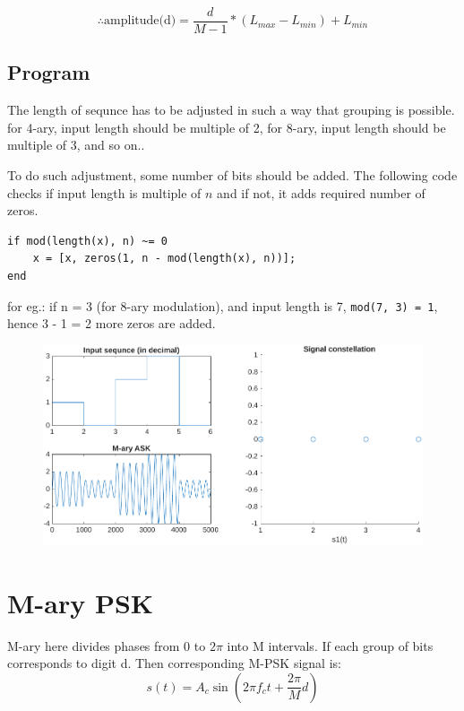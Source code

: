 $$\therefore \text{amplitude(d)} = \frac{d}{M-1} * (L_{max} - L_{min}) + L_{min}$$

\subsection*{Program}
The length of sequnce has to be adjusted in such a way that grouping is possible. for 4-ary, input length should be multiple of 2, for 8-ary, input length should be multiple of 3, and so on..

To do such adjustment, some number of bits should be added. The following code checks if input length is multiple of $n$ and if not, it adds required number of zeros.
\begin{verbatim}
if mod(length(x), n) ~= 0
    x = [x, zeros(1, n - mod(length(x), n))];
end
\end{verbatim}

for eg.: if n = 3 (for 8-ary modulation), and input length is 7, {\tt mod(7, 3) = 1}, hence 3 - 1 = 2 more zeros are added.

\begin{figure}[ht!]
	\centering
	\includegraphics[width=\textwidth]{img/mask.pdf}
\end{figure}


\section{M-ary PSK}
M-ary here divides phases from 0 to $2\pi$ into M intervals.
If each group of bits corresponds to digit d. Then corresponding M-PSK signal is:
$$s(t) = A_c \sin\left(2 \pi f_c t + \frac{2\pi}{M} d\right)$$

